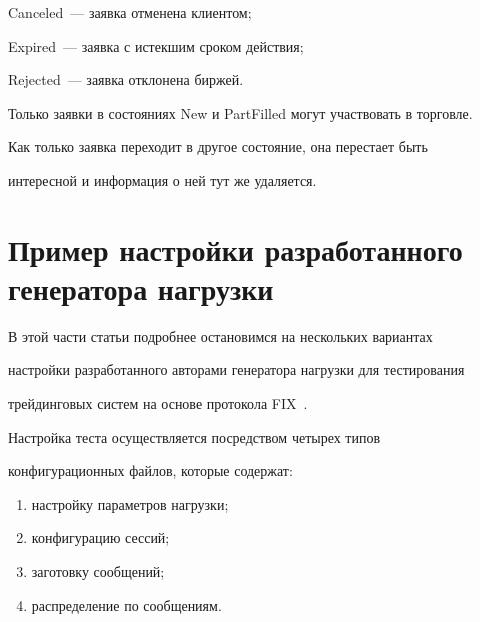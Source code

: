 {\sf Canceled}~---  заявка отменена клиентом;





{\sf Expired}~--- заявка с истекшим сроком действия;





{\sf Rejected}~--- заявка отклонена биржей.





  Только заявки в состояниях {\sf New} и {\sf PartFilled} могут участвовать в торговле.


Как только заявка переходит в другое состояние, она перестает быть


интересной и информация о ней тут же удаляется.





\section{Пример настройки разработанного генератора нагрузки}





  В этой части статьи подробнее остановимся на нескольких вариантах


настройки разработанного авторами генератора нагрузки для тестирования


трейдинговых систем на основе протокола FIX~\cite{16-g}.





  Настройка теста осуществляется посредством четырех типов


конфигурационных файлов, которые содержат:


  \begin{enumerate}[(1)]


\item настройку параметров нагрузки;


\item конфигурацию сессий;


\item заготовку сообщений;


\item распределение по сообщениям.


  \end{enumerate}





